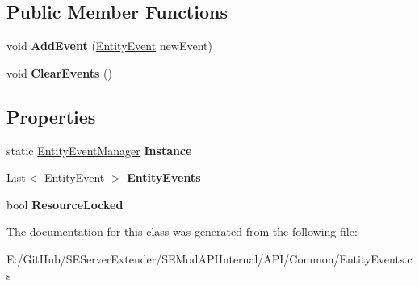 \subsection*{Public Member Functions}
\begin{DoxyCompactItemize}
\item 
\hypertarget{class_s_e_mod_a_p_i_internal_1_1_a_p_i_1_1_common_1_1_entity_event_manager_a5c3fd2df12e472aa0d422bf01a3174be}{}void {\bfseries Add\+Event} (\hyperlink{struct_s_e_mod_a_p_i_internal_1_1_a_p_i_1_1_common_1_1_entity_event_manager_1_1_entity_event}{Entity\+Event} new\+Event)\label{class_s_e_mod_a_p_i_internal_1_1_a_p_i_1_1_common_1_1_entity_event_manager_a5c3fd2df12e472aa0d422bf01a3174be}

\item 
\hypertarget{class_s_e_mod_a_p_i_internal_1_1_a_p_i_1_1_common_1_1_entity_event_manager_afe95317e730b63b607da32fc3c4d03e2}{}void {\bfseries Clear\+Events} ()\label{class_s_e_mod_a_p_i_internal_1_1_a_p_i_1_1_common_1_1_entity_event_manager_afe95317e730b63b607da32fc3c4d03e2}

\end{DoxyCompactItemize}
\subsection*{Properties}
\begin{DoxyCompactItemize}
\item 
\hypertarget{class_s_e_mod_a_p_i_internal_1_1_a_p_i_1_1_common_1_1_entity_event_manager_a0a9f4559ea8ff5a22d5f31332baeca5e}{}static \hyperlink{class_s_e_mod_a_p_i_internal_1_1_a_p_i_1_1_common_1_1_entity_event_manager}{Entity\+Event\+Manager} {\bfseries Instance}\label{class_s_e_mod_a_p_i_internal_1_1_a_p_i_1_1_common_1_1_entity_event_manager_a0a9f4559ea8ff5a22d5f31332baeca5e}

\item 
\hypertarget{class_s_e_mod_a_p_i_internal_1_1_a_p_i_1_1_common_1_1_entity_event_manager_a5c177cfe72dd6ffd7efa00a511e9949f}{}List$<$ \hyperlink{struct_s_e_mod_a_p_i_internal_1_1_a_p_i_1_1_common_1_1_entity_event_manager_1_1_entity_event}{Entity\+Event} $>$ {\bfseries Entity\+Events}\label{class_s_e_mod_a_p_i_internal_1_1_a_p_i_1_1_common_1_1_entity_event_manager_a5c177cfe72dd6ffd7efa00a511e9949f}

\item 
\hypertarget{class_s_e_mod_a_p_i_internal_1_1_a_p_i_1_1_common_1_1_entity_event_manager_a198e039578d480d7167fa66ea0102bde}{}bool {\bfseries Resource\+Locked}\label{class_s_e_mod_a_p_i_internal_1_1_a_p_i_1_1_common_1_1_entity_event_manager_a198e039578d480d7167fa66ea0102bde}

\end{DoxyCompactItemize}


The documentation for this class was generated from the following file\+:\begin{DoxyCompactItemize}
\item 
E\+:/\+Git\+Hub/\+S\+E\+Server\+Extender/\+S\+E\+Mod\+A\+P\+I\+Internal/\+A\+P\+I/\+Common/Entity\+Events.\+cs\end{DoxyCompactItemize}
